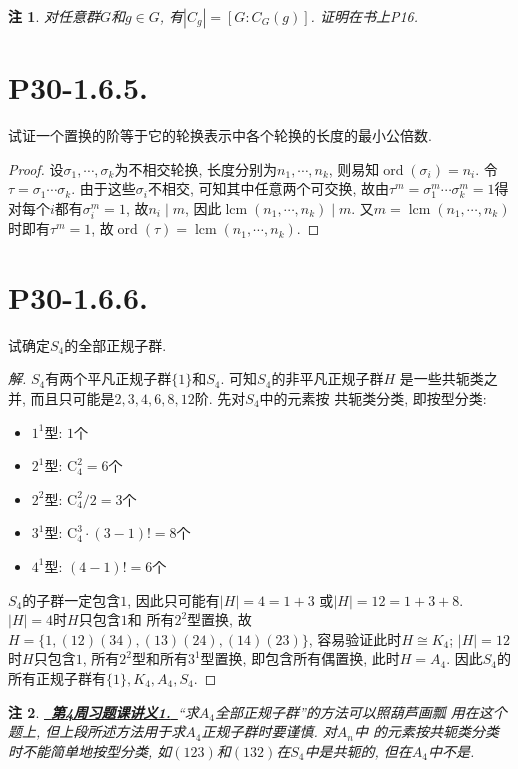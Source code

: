 \documentclass[12pt, a4paper, fontset=windows]{ctexart}
\newcommand{\abs}[1]{\left|{#1}\right|}
\newcommand{\isom}{\cong} %
\newcommand{\lcm}{\operatorname{lcm}}
\newcommand{\myref}[2][]{\hyperref[#1]{\color{blue}\ {#2}\ }}
\newcommand{\ord}{\operatorname{ord}}
\newcommand{\yh}[1]{“{#1}”} %
\newtheorem*{remark}{注}
\newenvironment{solution}{\begin{proof}[解]}{\end{proof}}
\begin{document}
\begin{remark}
对任意群$G$和$g\in G$, 有$\abs{C_g}=[G:C_G(g)]$. 证明在书上P16. {\rm\cite{jsds}}
\end{remark}

\section*{P30-1.6.5.}

试证一个置换的阶等于它的轮换表示中各个轮换的长度的最小公倍数. 

\begin{proof}
设$\sigma_1,\cdots,\sigma_k$为不相交轮换, 长度分别为$n_1,\cdots,n_k$, 
则易知$\ord(\sigma_i)=n_i$. 令$\tau=\sigma_1\cdots\sigma_k$. 
由于这些$\sigma_i$不相交, 可知其中任意两个可交换, 
故由$\tau^m=\sigma_1^m\cdots\sigma_k^m=1$得
对每个$i$都有$\sigma_i^m=1$, 故$n_i\mid m$, 
因此$\lcm(n_1,\cdots,n_k)\mid m$. 又$m=\lcm(n_1,\cdots,n_k)$
时即有$\tau^m=1$, 故$\ord(\tau)=\lcm(n_1,\cdots,n_k)$. 
\end{proof}

\section*{P30-1.6.6.}

试确定$S_4$的全部正规子群. 

\begin{solution}
$S_4$有两个平凡正规子群$\{1\}$和$S_4$. 可知$S_4$的非平凡正规子群$H$
是一些共轭类之并, 而且只可能是$2,3,4,6,8,12$阶. 先对$S_4$中的元素按
共轭类分类, 即按型分类: 
\begin{itemize}[itemsep=0pt]
    \item $1^1$型: $1$个
    \item $2^1$型: $\mathrm{C}^2_4=6$个
    \item $2^2$型: $\mathrm{C}^2_4/2=3$个
    \item $3^1$型: $\mathrm{C}^3_4\cdot(3-1)!=8$个
    \item $4^1$型: $(4-1)!=6$个
\end{itemize}

$S_4$的子群一定包含$1$, 因此只可能有$\abs{H}=4=1+3$
或$\abs{H}=12=1+3+8$. $\abs{H}=4$时$H$只包含$1$和
所有$2^2$型置换, 故$H=\{1,(12)(34),
(13)(24),(14)(23)\}$, 容易验证此时$H\isom K_4$; 
$\abs{H}=12$时$H$只包含$1$, 所有$2^2$型和所有$3^1$型置换, 
即包含所有偶置换, 此时$H=A_4$. 
因此$S_4$的所有正规子群有$\{1\},K_4,A_4,S_4$. 
\end{solution}

\begin{remark}
\myref[A4-lhd]{\bf 第4周习题课讲义1.}\yh{求$A_4$全部正规子群}的方法可以照葫芦画瓢
用在这个题上, 但上段所述方法用于求$A_4$正规子群时要谨慎. 对$A_n$中
的元素按共轭类分类时不能简单地按型分类, 
如$(123)$和$(132)$在$S_4$中是共轭的, 但在$A_4$中不是. 
\end{remark}
\end{document}
